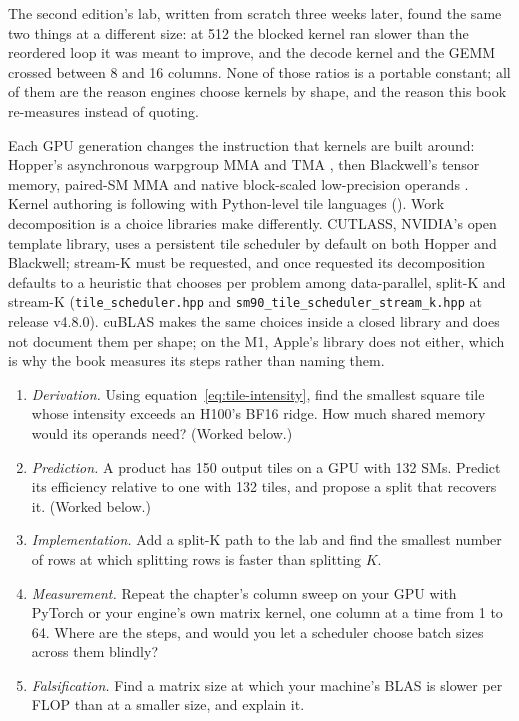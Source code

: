 The second edition's lab, written from scratch three weeks later, found the same
two things at a different size: at 512 the blocked kernel ran slower than the
reordered loop it was meant to improve, and the decode kernel and the GEMM
crossed between 8 and 16 columns. None of those ratios is a portable constant;
all of them are the reason engines choose kernels by shape, and the reason this
book re-measures instead of quoting.


Each GPU generation changes the instruction that kernels are built around:
Hopper's asynchronous warpgroup MMA and TMA \cite{nvidia2026cutlasswgmma}, then
Blackwell's tensor memory, paired-SM MMA and native block-scaled low-precision
operands \cite{nvidia2026cutlassblackwell}. Kernel authoring is following with
Python-level tile languages (). Work decomposition is a
choice libraries make differently. CUTLASS, NVIDIA's open template library, uses
a persistent tile scheduler by default on both Hopper and Blackwell; stream-K
must be requested, and once requested its decomposition defaults to a heuristic
that chooses per problem among data-parallel, split-K and stream-K
(\texttt{tile\_scheduler.hpp} and \texttt{sm90\_tile\_scheduler\_stream\_k.hpp}
at release v4.8.0). cuBLAS makes the same choices inside a closed library and
does not document them per shape; on the M1, Apple's library does not either,
which is why the book measures its steps rather than naming them.

\ExercisesSection

\begin{enumerate}
\item \emph{Derivation.} Using equation~\eqref{eq:tile-intensity}, find the
smallest square tile whose intensity exceeds an H100's BF16 ridge. How much
shared memory would its operands need? (Worked below.)
\item \emph{Prediction.} A product has 150 output tiles on a GPU with 132
SMs. Predict its efficiency relative to one with 132 tiles, and propose a
split that recovers it. (Worked below.)
\item \emph{Implementation.} Add a split-K path to the lab and find the
smallest number of rows at which splitting rows is faster than splitting $K$.
\item \emph{Measurement.} Repeat the chapter's column sweep on your GPU with
PyTorch or your engine's own matrix kernel, one column at a time from 1 to 64.
Where are the steps, and would you let a scheduler choose batch sizes across
them blindly?
\item \emph{Falsification.} Find a matrix size at which your machine's BLAS is
slower per FLOP than at a smaller size, and explain it.
\end{enumerate}


